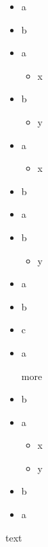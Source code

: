 \begin{itemize}
\item
  a
\item
  b
\end{itemize}

\begin{itemize}
\tightlist
\item
  a

  \begin{itemize}
  \tightlist
  \item
    x
  \end{itemize}
\item
  b

  \begin{itemize}
  \tightlist
  \item
    y
  \end{itemize}
\end{itemize}

\begin{itemize}
\tightlist
\item
  a

  \begin{itemize}
  \tightlist
  \item
    x
  \end{itemize}
\item
  b
\end{itemize}

\begin{itemize}
\item
  a
\item
  b

  \begin{itemize}
  \tightlist
  \item
    y
  \end{itemize}
\end{itemize}

\begin{itemize}
\item
  a
\item
  b
\item
  c
\end{itemize}

\begin{itemize}
\item
  a

  more
\item
  b
\end{itemize}

\begin{itemize}
\tightlist
\item
  a

  \begin{itemize}
  \item
    x
  \item
    y
  \end{itemize}
\item
  b
\end{itemize}

\begin{itemize}
\tightlist
\item
  a
\end{itemize}

text
